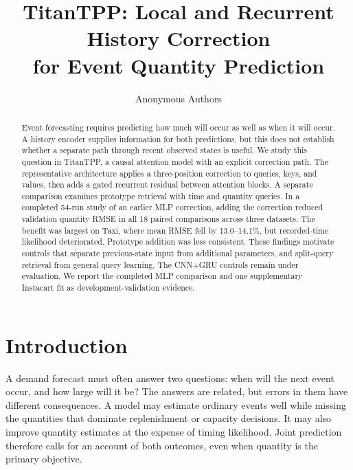 \documentclass[runningheads]{llncs}
\begin{document}
\title{TitanTPP: Local and Recurrent History Correction\texorpdfstring{\\}{ }for Event Quantity Prediction}
\author{Anonymous Authors}
\maketitle

\begin{abstract}
Event forecasting requires predicting how much will occur as well as when it will occur. A history encoder supplies information for both predictions, but this does not establish whether a separate path through recent observed states is useful. We study this question in TitanTPP, a causal attention model with an explicit correction path. The representative architecture applies a three-position correction to queries, keys, and values, then adds a gated recurrent residual between attention blocks. A separate comparison examines prototype retrieval with time and quantity queries. In a completed 54-run study of an earlier MLP correction, adding the correction reduced validation quantity RMSE in all 18 paired comparisons across three datasets. The benefit was largest on Taxi, where mean RMSE fell by 13.0--14.1\%, but recorded-time likelihood deteriorated. Prototype addition was less consistent. These findings motivate controls that separate previous-state input from additional parameters, and split-query retrieval from general query learning. The CNN+GRU controls remain under evaluation. We report the completed MLP comparison and one supplementary Instacart fit as development-validation evidence.
\end{abstract}

\section{Introduction}
A demand forecast must often answer two questions: when will the next event occur, and how large will it be? The answers are related, but errors in them have different consequences. A model may estimate ordinary events well while missing the quantities that dominate replenishment or capacity decisions. It may also improve quantity estimates at the expense of timing likelihood. Joint prediction therefore calls for an account of both outcomes, even when quantity is the primary objective.
\end{document}
